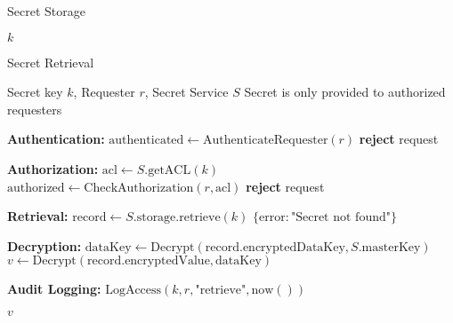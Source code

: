 \begin{tcolorbox}
\begin{tcolorbox}
\begin{protocol}{Secret Storage}
\begin{algorithmic}[1]
\State \Return $k$
\end{algorithmic}
\end{protocol}
\end{tcolorbox}


\begin{tcolorbox}[
    enhanced,
    colback=blue!5!white,
    colframe=blue!75!black,
    arc=5mm,
    boxrule=1.5pt,
    title=Secret Protocol,
    fonttitle=\bfseries,
    coltitle=white,
    attach boxed title to top left={yshift=-2mm, xshift=5mm},
    boxed title style={colback=blue!75!black, rounded corners},
    shadow={2mm}{-2mm}{0mm}{black!50},
    drop fuzzy shadow
]
\begin{tcolorbox}[
    enhanced,
    colback=blue!5!white,
    colframe=blue!75!black,
    arc=5mm,
    boxrule=1.5pt,
    title=Protocol,
    fonttitle=\bfseries,
    coltitle=white,
    attach boxed title to top left={yshift=-2mm, xshift=5mm},
    boxed title style={colback=blue!75!black, rounded corners},
    shadow={2mm}{-2mm}{0mm}{black!50},
    drop fuzzy shadow
]
\begin{protocol}{Secret Retrieval}
\label{prot:secret-retrieval}
\begin{algorithmic}[1]
\Require Secret key $k$, Requester $r$, Secret Service $S$
\Ensure Secret is only provided to authorized requesters

\State \textbf{Authentication:}
\State $\text{authenticated} \gets \text{AuthenticateRequester}(r)$
    \State \textbf{reject} request
\EndIf

\State \textbf{Authorization:}
\State $\text{acl} \gets S.\text{getACL}(k)$
\State $\text{authorized} \gets \text{CheckAuthorization}(r, \text{acl})$
    \State \textbf{reject} request
\EndIf

\State \textbf{Retrieval:}
\State $\text{record} \gets S.\text{storage}.\text{retrieve}(k)$
    \State \Return $\{\text{error}: \text{"Secret not found"}\}$
\EndIf

\State \textbf{Decryption:}
\State $\text{dataKey} \gets \text{Decrypt}(\text{record}.\text{encryptedDataKey}, S.\text{masterKey})$
\State $v \gets \text{Decrypt}(\text{record}.\text{encryptedValue}, \text{dataKey})$

\State \textbf{Audit Logging:}
\State $\text{LogAccess}(k, r, \text{"retrieve"}, \text{now}())$

\State \Return $v$
\end{algorithmic}
\end{protocol}
\end{tcolorbox}



\end{tcolorbox}
\end{tcolorbox}
